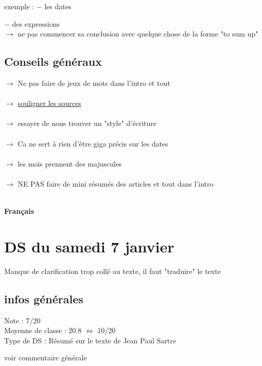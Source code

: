 \documentclass{book}
\begin{document}
exemple : $-$ les dates

\hspace{1.5 cm} $-$ des expressions \\

$\rightarrow$ ne pas commencer sa conclusion avec quelque chose de la forme "to sum up"

\subsection{Conseils généraux}

$\rightarrow$ Ne pas faire de jeux de mots dans l'intro et tout \\ \\
$\rightarrow$ \underline{souligner les sources} \\ \\
$\rightarrow$ essayer de nous trouver un "style" d'écriture \\ \\
$\rightarrow$ Ca ne sert à rien d'être giga précis sur les dates \\ \\
$\rightarrow$ les mois prennent des majuscules \\ \\
$\rightarrow$ NE PAS faire de mini résumés des articles et tout dans l'intro \\ \\




\begin{center}
\textbf{\large Français}
\end{center}

\vspace{0.6cm}

\section{DS du samedi 7 janvier}

\begin{tcolorbox}[width={14cm},colback={yellow!20!white},title={\textbf{Commentaire générale sur ce Résumé}},colbacktitle=red!40!white,coltitle=black]    
	Manque de clarification trop collé au texte, il faut "traduire" le texte
\end{tcolorbox}

\subsection{infos générales}

Note : 7/20 \\

Moyenne de classe : 20.8 $\Leftrightarrow$ 10/20 \\

Type de DS : Résumé sur le texte de Jean Paul Sartre

voir commentaire générale
\end{document}
